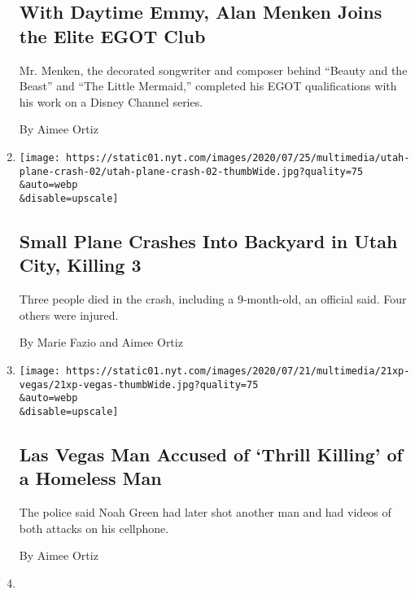 \begin{enumerate}
{  \subsection{With Daytime Emmy, Alan Menken Joins the Elite EGOT
  Club}\label{with-daytime-emmy-alan-menken-joins-the-elite-egot-club}}

  Mr. Menken, the decorated songwriter and composer behind ``Beauty and
  the Beast'' and ``The Little Mermaid,'' completed his EGOT
  qualifications with his work on a Disney Channel series.

  By Aimee Ortiz
\item
  \href{/2020/07/25/us/plane-crash-west-jordan-utah.html}{}

  \texttt{[image: https://static01.nyt.com/images/2020/07/25/multimedia/utah-plane-crash-02/utah-plane-crash-02-thumbWide.jpg?quality=75\\\&auto=webp\\\&disable=upscale]}

  \hypertarget{small-plane-crashes-into-backyard-in-utah-city-killing-3}{%
  \subsection{Small Plane Crashes Into Backyard in Utah City, Killing
  3}\label{small-plane-crashes-into-backyard-in-utah-city-killing-3}}

  Three people died in the crash, including a 9-month-old, an official
  said. Four others were injured.

  By Marie Fazio and Aimee Ortiz
\item
  \href{/2020/07/21/us/las-vegas-homeless-man-thrill-killing.html}{}

  \texttt{[image: https://static01.nyt.com/images/2020/07/21/multimedia/21xp-vegas/21xp-vegas-thumbWide.jpg?quality=75\\\&auto=webp\\\&disable=upscale]}

  \hypertarget{las-vegas-man-accused-of-thrill-killing-of-a-homeless-man}{%
  \subsection{Las Vegas Man Accused of `Thrill Killing' of a Homeless
  Man}\label{las-vegas-man-accused-of-thrill-killing-of-a-homeless-man}}

  The police said Noah Green had later shot another man and had videos
  of both attacks on his cellphone.

  By Aimee Ortiz
\item
  \href{/2020/07/21/us/detroit-police-shooting-journalists.html}{}


\end{enumerate}
